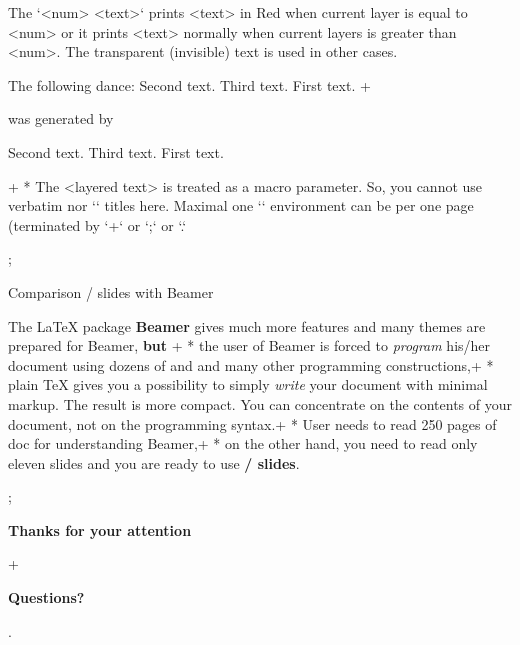 The `{\pshow<num> <text>}` prints <text> in Red when current layer is equal
to <num> or it prints <text> normally when current layers is greater than <num>.
The transparent (invisible) text is used in other cases.

The following dance:
{ Second text.} { Third text.} { First text.}
\endlayers
\pg+

was generated by

\begtt
{}
{ Second text.} { Third text.} { First text.}
\endlayers
\endtt

\pg+
* The <layered text> is treated as a macro parameter. So, you cannot use verbatim
  nor `\sec` titles here. Maximal one `\layers` environment can be per one
  page (terminated by `\pg+` or `\pg;` or `\pg.`

\pg; %

\sec Comparison \OpTeX/ slides with Beamer

The \LaTeX{} package {\bf\Blue Beamer} gives much more features and many themes
are prepared for Beamer, {\bf\Red but}
\pg+
* the user of Beamer is forced to {\em program} his/her document using
  dozens of \code{\\begin{foo}} and \code{\\end{foo}} and many other
  programming constructions,\pg+
* plain \TeX{} gives you a possibility to simply
  {\em write} your document with minimal markup. The result is more compact.
  You can concentrate on the contents of your document, not on the
  programming syntax.\pg+
* User needs to read 250 pages of doc for understanding Beamer,\pg+
* on the other hand, you need to read only eleven
  slides
  and you are ready to use {\bf\Blue\OpTeX/ slides}.

\pg; %

\null
\vskip2cm
\centerline{\typosize[35/40]\bf Thanks for your attention}\pg+

\vskip2cm
\centerline{\Blue\typosize[60/70]\bf Questions?}

\pg. %

